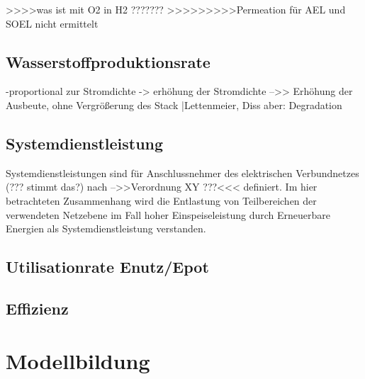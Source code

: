 \documentclass[onecolumn,10pt,titlepage]{article}
\begin{document}
>>>>was ist mit O2 in H2 ??????? >>>>>>>>>Permeation für AEL und SOEL nicht ermittelt\\


\subsection{Wasserstoffproduktionsrate}
-proportional zur Stromdichte -> erhöhung der Stromdichte -->> Erhöhung der Ausbeute, ohne Vergrößerung des Stack |Lettenmeier, Diss
aber: Degradation

\subsection{Systemdienstleistung}
Systemdienstleistungen sind für Anschlussnehmer des elektrischen Verbundnetzes (??? stimmt das?) nach -->>Verordnung XY ???<<< definiert.
Im hier betrachteten Zusammenhang wird die Entlastung von Teilbereichen der verwendeten Netzebene im Fall hoher Einspeiseleistung durch Erneuerbare Energien als Systemdienstleistung verstanden.

\subsection{Utilisationrate Enutz/Epot}

\subsection{Effizienz}



\section{Modellbildung}
\end{document}
